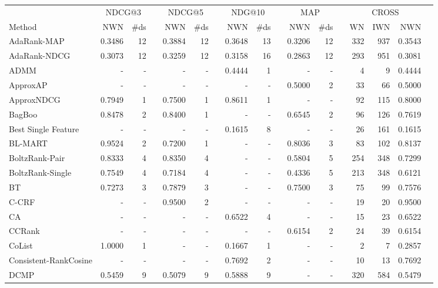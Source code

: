 \documentclass{sig-alternate}
\begin{document}
\scriptsize{
\begin{longtable}[!hpt]{@{}lrrrrrrrrrrrrrrrr@{}}\toprule
& \multicolumn{2}{c}{NDCG@3} & \phantom{a} 
& \multicolumn{2}{c}{NDCG@5} & \phantom{a} 
& \multicolumn{2}{c}{NDG@10} & \phantom{a} 
& \multicolumn{2}{c}{MAP}    & \phantom{a}
& \multicolumn{3}{c}{CROSS}\\
\cmidrule{2-3} \cmidrule{5-6} \cmidrule{8-9} \cmidrule{11-12} \cmidrule{14-16}
Method & NWN & \#ds && NWN & \#ds && NWN & \#ds && NWN & \#ds && WN & IWN & NWN \\ \midrule\endhead
AdaRank-MAP & 0.3486 & 12 && 0.3884 & 12 && 0.3648 & 13 && 0.3206 & 12 && 332 & 937 & 0.3543 \\
AdaRank-NDCG & 0.3073 & 12 && 0.3259 & 12 && 0.3158 & 16 && 0.2863 & 12 && 293 & 951 & 0.3081 \\
ADMM & - & - && - & - && 0.4444 & 1 && - & - && 4 & 9 & 0.4444 \\
ApproxAP & - & - && - & - && - & - && 0.5000 & 2 && 33 & 66 & 0.5000 \\
ApproxNDCG & 0.7949 & 1 && 0.7500 & 1 && 0.8611 & 1 && - & - && 92 & 115 & 0.8000 \\
BagBoo & 0.8478 & 2 && 0.8400 & 1 && - & - && 0.6545 & 2 && 96 & 126 & 0.7619 \\
Best Single Feature & - & - && - & - && 0.1615 & 8 && - & - && 26 & 161 & 0.1615 \\
BL-MART & 0.9524 & 2 && 0.7200 & 1 && - & - && 0.8036 & 3 && 83 & 102 & 0.8137 \\
BoltzRank-Pair & 0.8333 & 4 && 0.8350 & 4 && - & - && 0.5804 & 5 && 254 & 348 & 0.7299 \\
BoltzRank-Single & 0.7549 & 4 && 0.7184 & 4 && - & - && 0.4336 & 5 && 213 & 348 & 0.6121 \\
BT & 0.7273 & 3 && 0.7879 & 3 && - & - && 0.7500 & 3 && 75 & 99 & 0.7576 \\
C-CRF & - & - && 0.9500 & 2 && - & - && - & - && 19 & 20 & 0.9500 \\
CA & - & - && - & - && 0.6522 & 4 && - & - && 15 & 23 & 0.6522 \\
CCRank & - & - && - & - && - & - && 0.6154 & 2 && 24 & 39 & 0.6154 \\
CoList & 1.0000 & 1 && - & - && 0.1667 & 1 && - & - && 2 & 7 & 0.2857 \\
Consistent-RankCosine & - & - && - & - && 0.7692 & 2 && - & - && 10 & 13 & 0.7692 \\
DCMP & 0.5459 & 9 && 0.5079 & 9 && 0.5888 & 9 && - & - && 320 & 584 & 0.5479 \\

\end{longtable}}
\end{document}
